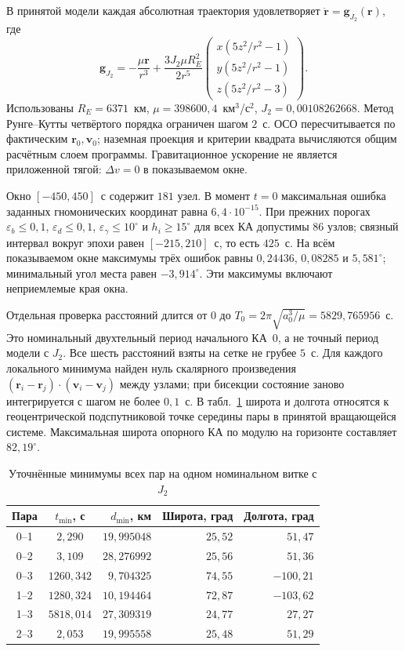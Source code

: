 \documentclass[a4paper,12pt]{article}
\begin{document}
В принятой модели каждая абсолютная траектория
удовлетворяет $\ddot{\mathbf r}=\mathbf g_{J_2}(\mathbf r)$, где
\begin{equation}
\mathbf g_{J_2}=-\frac{\mu\mathbf r}{r^3}
+\frac{3J_2\mu R_E^2}{2r^5}
\begin{pmatrix}
x(5z^2/r^2-1)\\ y(5z^2/r^2-1)\\ z(5z^2/r^2-3)
\end{pmatrix}.
\end{equation}
Использованы $R_E=6371$~км,
$\mu=398600{,}4$~км$^3$/с$^2$,
$J_2=0{,}00108262668$. Метод Рунге--Кутты
четвёртого порядка ограничен шагом $2$~с.
ОСО пересчитывается по фактическим
$\mathbf r_0,\mathbf v_0$; наземная проекция
и критерии квадрата вычисляются общим расчётным
слоем программы. Гравитационное ускорение
не является приложенной тягой: $\Delta v=0$
в показываемом окне.

Окно $[-450,450]$~с содержит $181$ узел.
В момент $t=0$ максимальная ошибка заданных
гномонических координат равна $6{,}4\cdot10^{-15}$.
При прежних порогах $\varepsilon_b\leq0{,}1$,
$\varepsilon_d\leq0{,}1$,
$\varepsilon_\gamma\leq10^\circ$ и
$h_i\geq15^\circ$ для всех КА допустимы
$86$ узлов; связный интервал вокруг эпохи
равен $[-215,210]$~с, то есть $425$~с.
На всём показываемом окне максимумы трёх
ошибок равны $0{,}24436$, $0{,}08285$ и
$5{,}581^\circ$; минимальный угол места
равен $-3{,}914^\circ$. Эти максимумы
включают неприемлемые края окна.

Отдельная проверка расстояний длится от $0$
до $T_0=2\pi\sqrt{a_0^3/\mu}=5829{,}765956$~с.
Это номинальный двухтельный период начального
КА~0, а не точный период модели с $J_2$.
Все шесть расстояний взяты на сетке не грубее
$5$~с. Для каждого локального минимума
найден нуль скалярного произведения
$(\mathbf r_i-\mathbf r_j)\cdot
(\mathbf v_i-\mathbf v_j)$ между узлами;
при бисекции состояние заново интегрируется
с шагом не более $0{,}1$~с.
В табл.~\ref{tab:j2_minima} широта и долгота
относятся к геоцентрической подспутниковой
точке середины пары в принятой вращающейся
системе. Максимальная широта опорного КА
по модулю на горизонте составляет $82{,}19^\circ$.

\begin{table}[htbp]
\centering\small
\caption{Уточнённые минимумы всех пар на одном номинальном витке с $J_2$}
\label{tab:j2_minima}
\begin{tabular}{ccrrr}
\toprule
Пара & $t_{\min}$, с & $d_{\min}$, км & Широта, град & Долгота, град\\
\midrule
0--1 & $2{,}290$ & $19{,}995048$ & $25{,}52$ & $51{,}47$\\
0--2 & $3{,}109$ & $28{,}276992$ & $25{,}56$ & $51{,}36$\\
0--3 & $1260{,}342$ & $9{,}704325$ & $74{,}55$ & $-100{,}21$\\
1--2 & $1280{,}324$ & $10{,}194464$ & $72{,}87$ & $-103{,}62$\\
1--3 & $5818{,}014$ & $27{,}309319$ & $24{,}77$ & $27{,}27$\\
2--3 & $2{,}053$ & $19{,}995558$ & $25{,}48$ & $51{,}29$\\
\bottomrule
\end{tabular}
\end{table}
\end{document}
